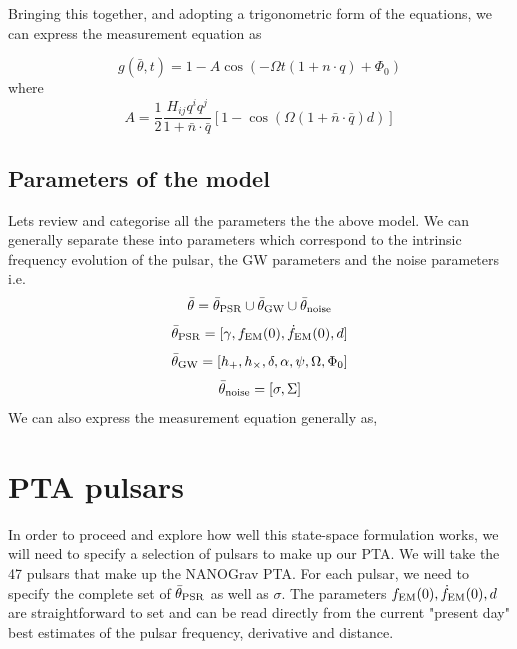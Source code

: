 \documentclass[fleqn,usenatbib,useAMS]{mnras}
\begin{document}
\noindent Bringing this together, and adopting a trigonometric form of the equations, we can express the measurement equation as 


\begin{equation} 
	g(\bar{\theta},t) = 1 -A \cos(-\Omega t (1 + n\cdot q ) + \Phi_0)
\end{equation}
where 
\begin{equation}
	A =  \frac{1}{2} \frac{H_{ij} q^i q^j}{1 + \bar{n} \cdot \bar{q}}[1 - \cos\left( {\Omega(1+\bar{n} \cdot \bar{q}) d}\right)]
\end{equation}





\subsection{Parameters of the model}
\noindent Lets review and categorise all the parameters the the above model. We can generally separate these into parameters which correspond to the intrinsic frequency evolution of the pulsar, the GW parameters and the noise parameters i.e.
\begin{equation}
	\bar{\theta} =  \bar{\theta}_{\rm PSR} \cup \bar{\theta}_{\rm GW} \cup \bar{\theta}_{\rm noise}
\end{equation}
\begin{equation}
	\bar{\theta}_{\rm PSR} = [\gamma, f_{\rm EM}(0), \dot{f}_{\rm EM}(0),d]
\end{equation}
\begin{equation}
	\bar{\theta}_{\rm GW} = [h_{+}, h_{\times}, \delta, \alpha, \psi, \Omega, \Phi_0]
\end{equation}
\begin{equation}
	\bar{\theta}_{\rm noise} = [\sigma, \Sigma]
\end{equation}
We can also express the measurement equation generally as,




\section{PTA pulsars}
In order to proceed and explore how well this state-space formulation works, we will need to specify a selection of pulsars to make up our PTA. We will take the 47 pulsars that make up the NANOGrav PTA. For each pulsar, we need to specify the complete set of $\bar{\theta}_{\rm PSR}$ as well as $\sigma$. The parameters $f_{\rm EM}(0), \dot{f}_{\rm EM}(0),d$ are straightforward to set and can be read directly from  the current "present day" best estimates of the pulsar frequency, derivative and distance. 
 
\end{document}
